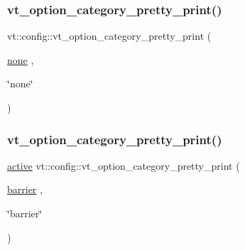 \subsubsection{\texorpdfstring{vt\+\_\+option\+\_\+category\+\_\+pretty\+\_\+print()}{vt\_option\_category\_pretty\_print()}\hspace{0.1cm}{\footnotesize\ttfamily [1/16]}}
{\footnotesize\ttfamily vt\+::config\+::vt\+\_\+option\+\_\+category\+\_\+pretty\+\_\+print (\begin{DoxyParamCaption}\item[{\hyperlink{namespacevt_1_1config_a6bd1d6215bda0d8ca02811798399f689a58436a9330bb7d9e28934e496ce96bfe}{none}}]{,  }\item[{\char`\"{}none\char`\"{}}]{ }\end{DoxyParamCaption})}

\mbox{\label{namespacevt_1_1config_a089a9240dd41790f1dc100673b4ec409}} 
\subsubsection{\texorpdfstring{vt\+\_\+option\+\_\+category\+\_\+pretty\+\_\+print()}{vt\_option\_category\_pretty\_print()}\hspace{0.1cm}{\footnotesize\ttfamily [2/16]}}
{\footnotesize\ttfamily \hyperlink{namespacevt_1_1config_a6bd1d6215bda0d8ca02811798399f689a82f77c67af0c363709010c6df4dbd920}{active} vt\+::config\+::vt\+\_\+option\+\_\+category\+\_\+pretty\+\_\+print (\begin{DoxyParamCaption}\item[{\hyperlink{namespacevt_1_1config_a6bd1d6215bda0d8ca02811798399f689a39d4d58fa73c76f6cb97e6dc20e0d1c0}{barrier}}]{,  }\item[{\char`\"{}barrier\char`\"{}}]{ }\end{DoxyParamCaption})}

\mbox{\label{namespacevt_1_1config_adc18d97d304941c901a2d06015ac4624}} 
